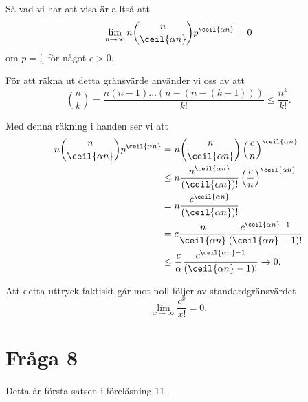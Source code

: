 \documentclass[nobib]{tufte-handout}
\begin{document}
Så vad vi har att visa är alltså att
$$\lim_{n \to \infty} n\binom{n}{\ceil{\alpha n}}p^{\ceil{\alpha n}} = 0$$
om $p = \frac{c}{n}$ för något $c > 0$.

För att räkna ut detta gränsvärde använder vi oss av att
$$\binom{n}{k} = \frac{n(n-1)\ldots(n-(n-(k-1)))}{k!} \leq \frac{n^k}{k!}.$$

Med denna räkning i handen ser vi att
\begin{align*}
    n\binom{n}{\ceil{\alpha n}}p^{\ceil{\alpha n}} &= n\binom{n}{\ceil{\alpha n}}\left(\frac{c}{n}\right)^{\ceil{\alpha n}}\\
    &\leq n\frac{n^{\ceil{\alpha n}}}{(\ceil{\alpha n})!}\left(\frac{c}{n}\right)^{\ceil{\alpha n}}\\
    &= n \frac{c^{\ceil{\alpha n}}}{(\ceil{\alpha n})!}\\
    &= c \frac{n}{\ceil{\alpha n}} \frac{c^{\ceil{\alpha n} - 1}}{(\ceil{\alpha n}-1)!}\\
    &\leq \frac{c}{\alpha}\frac{c^{\ceil{\alpha n} - 1}}{(\ceil{\alpha n}-1)!} \to 0.
\end{align*}

Att detta uttryck faktiskt går mot noll följer av standardgränsvärdet
$$\lim_{x \to \infty} \frac{c^x}{x!} = 0.$$

\section{Fråga 8}

Detta är första satsen i föreläsning 11.

%
%
\end{document}
